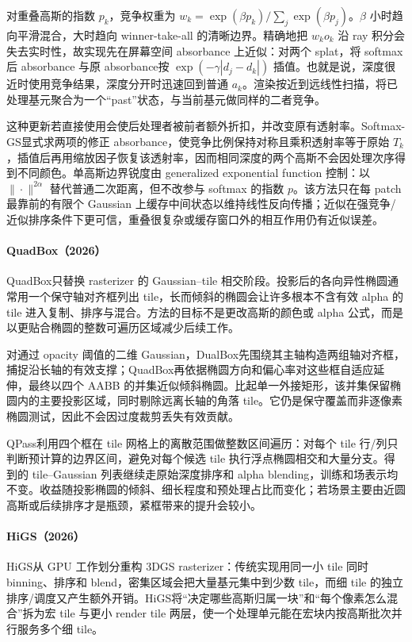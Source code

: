 对重叠高斯的指数 $p_k$，竞争权重为 $w_k=\exp(\beta p_k)/\sum_j\exp(\beta p_j)$。$\beta$ 小时趋向平滑混合，大时趋向 winner-take-all 的清晰边界。精确地把 $w_ko_k$ 沿 ray 积分会失去实时性，故实现先在屏幕空间 absorbance 上近似：对两个 splat，将 softmax 后 absorbance 与原 absorbance按 $\exp(-\gamma|d_j-d_k|)$ 插值。也就是说，深度很近时使用竞争结果，深度分开时迅速回到普通 $a_k$。渲染按近到远线性扫描，将已处理基元聚合为一个“past”状态，与当前基元做同样的二者竞争。

这种更新若直接使用会使后处理者被前者额外折扣，并改变原有透射率。Softmax-GS显式求两项的修正 absorbance，使竞争比例保持对称且乘积透射率等于原始 $T_k$，插值后再用缩放因子恢复该透射率，因而相同深度的两个高斯不会因处理次序得到不同颜色。单高斯边界锐度由 generalized exponential function 控制：以 $\|\cdot\|^{2\alpha}$ 替代普通二次距离，但不改参与 softmax 的指数 $p$。该方法只在每 patch 最靠前的有限个 Gaussian 上缓存中间状态以维持线性反向传播；近似在强竞争/近似排序条件下更可信，重叠很复杂或缓存窗口外的相互作用仍有近似误差。

\paragraph{QuadBox（2026）\cite{2605_04844}}
QuadBox只替换 rasterizer 的 Gaussian--tile 相交阶段。投影后的各向异性椭圆通常用一个保守轴对齐框列出 tile，长而倾斜的椭圆会让许多根本不含有效 alpha 的 tile 进入复制、排序与混合。方法的目标不是更改高斯的颜色或 alpha 公式，而是以更贴合椭圆的整数可遍历区域减少后续工作。

对通过 opacity 阈值的二维 Gaussian，DualBox先围绕其主轴构造两组轴对齐框，捕捉沿长轴的有效支撑；QuadBox再依据椭圆方向和偏心率对这些框自适应延伸，最终以四个 AABB 的并集近似倾斜椭圆。比起单一外接矩形，该并集保留椭圆内的主要投影区域，同时剔除远离长轴的角落 tile。它仍是保守覆盖而非逐像素椭圆测试，因此不会因过度裁剪丢失有效贡献。

QPass利用四个框在 tile 网格上的离散范围做整数区间遍历：对每个 tile 行/列只判断预计算的边界区间，避免对每个候选 tile 执行浮点椭圆相交和大量分支。得到的 tile--Gaussian 列表继续走原始深度排序和 alpha blending，训练和场表示均不变。收益随投影椭圆的倾斜、细长程度和预处理占比而变化；若场景主要由近圆高斯或后续排序才是瓶颈，紧框带来的提升会较小。

\paragraph{HiGS（2026）\cite{2606_00352}}
HiGS从 GPU 工作划分重构 3DGS rasterizer：传统实现用同一小 tile 同时 binning、排序和 blend，密集区域会把大量基元集中到少数 tile，而细 tile 的独立排序/调度又产生额外开销。HiGS将“决定哪些高斯归属一块”和“每个像素怎么混合”拆为宏 tile 与更小 render tile 两层，使一个处理单元能在宏块内按高斯批次并行服务多个细 tile。

